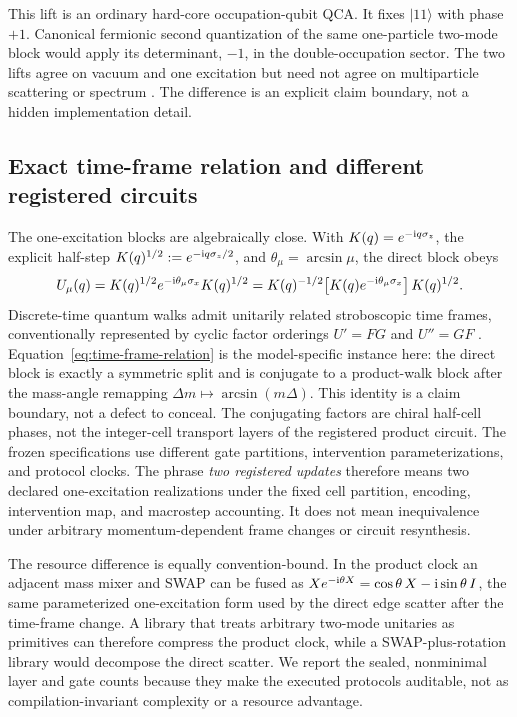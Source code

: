 This lift is an ordinary hard-core occupation-qubit QCA.  It fixes
$\lvert11\rangle$ with phase $+1$.  Canonical fermionic second quantization of
the same one-particle two-mode block would apply its determinant, $-1$, in the
double-occupation sector.  The two lifts agree on vacuum and one excitation
but need not agree on multiparticle scattering or spectrum
\citep{Farrelly2014CausalFermions,Mlodinow2020QFTQCA}.  The difference is an
explicit claim boundary, not a hidden implementation detail.

\subsection{Exact time-frame relation and different registered circuits}

The one-excitation blocks are algebraically close.  With
$K(q)=e^{-\mathrm{i} q\sigma_z}$, the explicit half-step
$K(q)^{1/2}:=e^{-\mathrm{i} q\sigma_z/2}$, and $\theta_\mu=\arcsin\mu$, the direct block obeys
\begin{equation}
 U_\mu(q)=K(q)^{1/2}e^{-\mathrm{i}\theta_\mu\sigma_x}K(q)^{1/2}
 =K(q)^{-1/2}\!\left[K(q)e^{-\mathrm{i}\theta_\mu\sigma_x}\right]K(q)^{1/2}.
 \label{eq:time-frame-relation}
\end{equation}
Discrete-time quantum walks admit unitarily related stroboscopic time frames,
conventionally represented by cyclic factor orderings $U'=FG$ and $U''=GF$
\citep{AsbothObuse2013TimeFrames}.  Equation~\eqref{eq:time-frame-relation}
is the model-specific instance here: the direct block is exactly a symmetric
split and is conjugate to a product-walk
block after the mass-angle remapping $\Delta m\mapsto\arcsin(m\Delta)$.  This
identity is a claim boundary, not a defect to conceal.  The conjugating factors
are chiral half-cell phases, not the integer-cell transport layers of the
registered product circuit.  The frozen specifications use different gate
partitions, intervention parameterizations, and protocol clocks.
The phrase \emph{two registered updates} therefore means two declared
one-excitation realizations under the fixed cell partition, encoding,
intervention map, and macrostep accounting.  It does not mean inequivalence
under arbitrary momentum-dependent frame changes or circuit resynthesis.

The resource difference is equally convention-bound.  In the product clock an
adjacent mass mixer and SWAP can be fused as
$X e^{-\mathrm{i}\theta X}=\cos\theta\,X-\mathrm{i}\sin\theta\,I$, the same
parameterized one-excitation form used by the direct edge scatter after the
time-frame change.  A library that treats arbitrary two-mode unitaries as
primitives can therefore compress
the product clock, while a SWAP-plus-rotation library would decompose the
direct scatter.  We report the sealed, nonminimal layer and gate counts because
they make the executed protocols auditable, not as compilation-invariant
complexity or a resource advantage.

